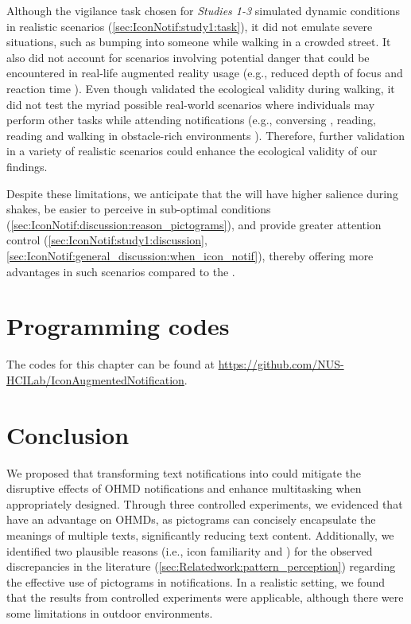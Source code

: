Although the vigilance task chosen for \textit{Studies 1-3} simulated dynamic conditions in realistic scenarios (\autoref{sec:IconNotif:study1:task}), it did not emulate severe situations, such as bumping into someone while walking in a crowded street. It also did not account for scenarios involving potential danger that could be encountered in real-life augmented reality usage (e.g., reduced depth of focus and reaction time \cite{sabelman_real_life_2015}). Even though \studyfour{} validated the ecological validity during walking, it did not test the myriad possible real-world scenarios where individuals may perform other tasks while attending notifications (e.g., conversing \cite{rzayev_effects_2020}, reading, reading and walking in obstacle-rich environments \cite{vadas_reading_2006}). Therefore, further validation in a variety of realistic scenarios could enhance the ecological validity of our findings. 

Despite these limitations, we anticipate that the \iconformat{} will have higher salience during shakes, be easier to perceive in sub-optimal conditions (\autoref{sec:IconNotif:discussion:reason_pictograms}), and provide greater attention control (\autoref{sec:IconNotif:study1:discussion}, \autoref{sec:IconNotif:general_discussion:when_icon_notif}), thereby offering more advantages in such scenarios compared to the \textformat{}. 





\section{Programming codes}
\label{sec:IconNotif:programming_codes}

\begin{sloppypar}
The codes for this chapter can be found at \url{https://github.com/NUS-HCILab/IconAugmentedNotification}.
\end{sloppypar}



\section{Conclusion}

We proposed that transforming text notifications into  could mitigate the disruptive effects of OHMD notifications and enhance multitasking when appropriately designed. Through three controlled experiments, we evidenced that  have an advantage on OHMDs, as pictograms can concisely encapsulate the meanings of multiple texts, significantly reducing text content. Additionally, we identified two plausible reasons (i.e., icon familiarity and \encodingcomplexity{}) for the observed discrepancies in the literature (\autoref{sec:Relatedwork:pattern_perception}) regarding the effective use of pictograms in notifications. In a realistic setting, we found that the results from controlled experiments were applicable, although there were some limitations in outdoor environments.

